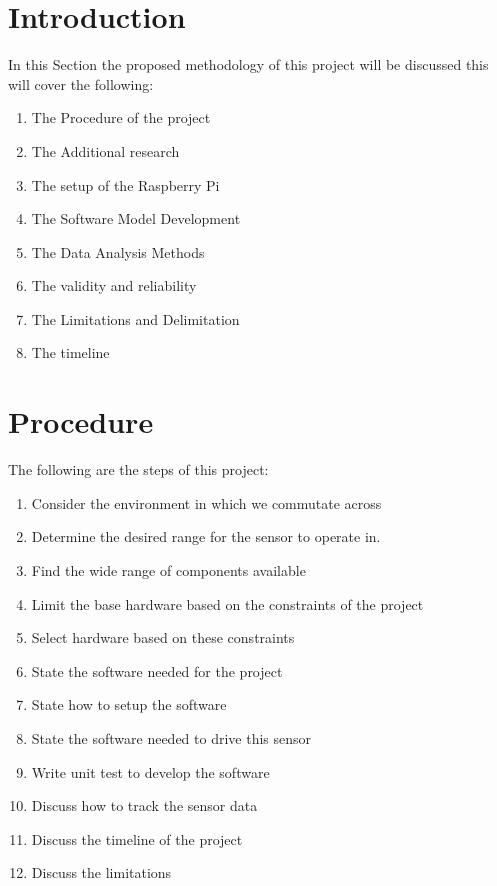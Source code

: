 
\section{Introduction}
In this  Section the  proposed  methodology of this  project will be discussed this will cover the  following:
\begin{enumerate}
    \item The Procedure of the project
    \item The Additional research
    \item The setup of the Raspberry Pi
    \item The Software Model Development
    \item The Data Analysis Methods
    \item The validity and reliability 
    \item The Limitations and Delimitation
    \item The timeline
\end{enumerate} 
\section{Procedure}
The following are the steps of this project:
\begin{enumerate}
    \item Consider the environment in which we commutate across
    \item Determine the desired range for the sensor to operate in.
    \item Find the wide range of components available
    \item Limit the base hardware based on the constraints of the project
    \item Select hardware based on these constraints
    \item State the software needed for the project
    \item State how to setup the software
    \item State the software needed to drive this sensor
    \item Write unit test to develop the software
    \item Discuss how to track the sensor data
    \item Discuss the timeline of the project
    \item Discuss the limitations 
  
\end{enumerate}
